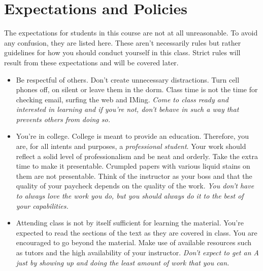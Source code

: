 \documentclass[10pt]{article}
\begin{document}
\section{Expectations and Policies}
The expectations for students in this course are not at all unreasonable.  To avoid any confusion, they are listed here.  These aren't necessarily rules but rather guidelines for how you should conduct yourself in this class.  Strict rules will result from these expectations and will be covered later.
\begin{itemize}
\item Be respectful of others.  Don't create unnecessary distractions.  Turn cell phones off, on silent or leave them in the dorm.  Class time is not the time for checking email, surfing the web and IMing.  \textit{Come to class ready and interested in learning and if you're not, don't behave in such a way that prevents others from doing so.}
\item You're in college.  College is meant to provide an education.  Therefore, you are, for all intents and purposes, a \textit{professional student}.  Your work should reflect a solid level of professionalism and be neat and orderly.  Take the extra time to make it presentable.  Crumpled papers with various liquid stains on them are not presentable.  Think of the instructor as your boss and that the quality of your paycheck depends on the quality of the work.  \textit{You don't have to always love the work you do, but you should always do it to the best of your capabilities.}
\item Attending class is not by itself sufficient for learning the material.  You're expected to read the sections of the text as they are covered in class.  You are encouraged to go beyond the material.  Make use of available resources such as tutors and the high availability of your instructor.  \textit{Don't expect to get an A just by showing up and doing the least amount of work that you can.}
\end{itemize}
\end{document}
